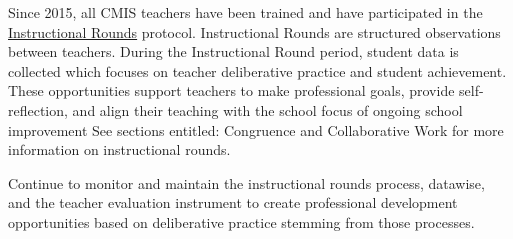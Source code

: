 \begin{findings}
Since 2015, all CMIS teachers have been trained and have participated in the \href{https://drive.google.com/a/cmis.ac.th/file/d/0B0TYmzaZNi3fUzVFUEdzTURtakk/view?usp=sharing}{Instructional Rounds} protocol. Instructional Rounds are structured observations between teachers. During the Instructional Round period, student data is collected which focuses on teacher deliberative practice and student achievement. These opportunities support teachers to make professional goals, provide self-reflection, and align their teaching with the school focus of ongoing school improvement See sections entitled: Congruence and Collaborative Work for more information on instructional rounds. 


Continue to monitor and maintain the instructional rounds process, datawise, and the teacher evaluation instrument to create professional development opportunities based on deliberative practice stemming from those processes.
\end{findings}
